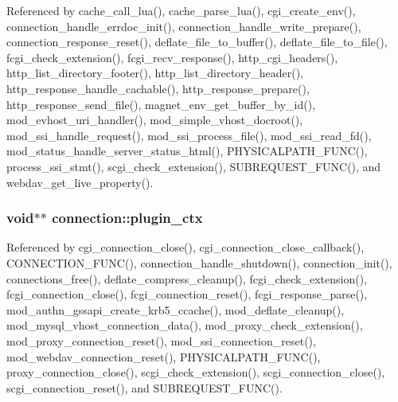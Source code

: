 Referenced by cache\-\_\-call\-\_\-lua(), cache\-\_\-parse\-\_\-lua(), cgi\-\_\-create\-\_\-env(), connection\-\_\-handle\-\_\-errdoc\-\_\-init(), connection\-\_\-handle\-\_\-write\-\_\-prepare(), connection\-\_\-response\-\_\-reset(), deflate\-\_\-file\-\_\-to\-\_\-buffer(), deflate\-\_\-file\-\_\-to\-\_\-file(), fcgi\-\_\-check\-\_\-extension(), fcgi\-\_\-recv\-\_\-response(), http\-\_\-cgi\-\_\-headers(), http\-\_\-list\-\_\-directory\-\_\-footer(), http\-\_\-list\-\_\-directory\-\_\-header(), http\-\_\-response\-\_\-handle\-\_\-cachable(), http\-\_\-response\-\_\-prepare(), http\-\_\-response\-\_\-send\-\_\-file(), magnet\-\_\-env\-\_\-get\-\_\-buffer\-\_\-by\-\_\-id(), mod\-\_\-evhost\-\_\-uri\-\_\-handler(), mod\-\_\-simple\-\_\-vhost\-\_\-docroot(), mod\-\_\-ssi\-\_\-handle\-\_\-request(), mod\-\_\-ssi\-\_\-process\-\_\-file(), mod\-\_\-ssi\-\_\-read\-\_\-fd(), mod\-\_\-status\-\_\-handle\-\_\-server\-\_\-status\-\_\-html(), P\-H\-Y\-S\-I\-C\-A\-L\-P\-A\-T\-H\-\_\-\-F\-U\-N\-C(), process\-\_\-ssi\-\_\-stmt(), scgi\-\_\-check\-\_\-extension(), S\-U\-B\-R\-E\-Q\-U\-E\-S\-T\-\_\-\-F\-U\-N\-C(), and webdav\-\_\-get\-\_\-live\-\_\-property().

\hypertarget{structconnection_a50b86ed1f96cd78db67d7178d27395ff}{
\subsubsection[{plugin\-\_\-ctx}]{\setlength{\rightskip}{0pt plus 5cm}void$\ast$$\ast$ connection\-::plugin\-\_\-ctx}}\label{structconnection_a50b86ed1f96cd78db67d7178d27395ff}


Referenced by cgi\-\_\-connection\-\_\-close(), cgi\-\_\-connection\-\_\-close\-\_\-callback(), C\-O\-N\-N\-E\-C\-T\-I\-O\-N\-\_\-\-F\-U\-N\-C(), connection\-\_\-handle\-\_\-shutdown(), connection\-\_\-init(), connections\-\_\-free(), deflate\-\_\-compress\-\_\-cleanup(), fcgi\-\_\-check\-\_\-extension(), fcgi\-\_\-connection\-\_\-close(), fcgi\-\_\-connection\-\_\-reset(), fcgi\-\_\-response\-\_\-parse(), mod\-\_\-authn\-\_\-gssapi\-\_\-create\-\_\-krb5\-\_\-ccache(), mod\-\_\-deflate\-\_\-cleanup(), mod\-\_\-mysql\-\_\-vhost\-\_\-connection\-\_\-data(), mod\-\_\-proxy\-\_\-check\-\_\-extension(), mod\-\_\-proxy\-\_\-connection\-\_\-reset(), mod\-\_\-ssi\-\_\-connection\-\_\-reset(), mod\-\_\-webdav\-\_\-connection\-\_\-reset(), P\-H\-Y\-S\-I\-C\-A\-L\-P\-A\-T\-H\-\_\-\-F\-U\-N\-C(), proxy\-\_\-connection\-\_\-close(), scgi\-\_\-check\-\_\-extension(), scgi\-\_\-connection\-\_\-close(), scgi\-\_\-connection\-\_\-reset(), and S\-U\-B\-R\-E\-Q\-U\-E\-S\-T\-\_\-\-F\-U\-N\-C().

